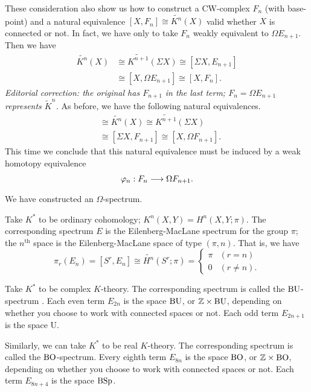\documentclass[../main]{subfiles}
\begin{document}
These consideration also show us how to construct a CW-complex $F_n$ (with base-point) and a natural equivalence $[X,F_n] \cong \widetilde{K^n}(X)$ valid whether $X$ is connected or not. In fact, we have only to take $F_n$ weakly equivalent to $\Omega E_{n+1}$. Then we have
    \begin{align*}
    \widetilde{K^n}(X)
    &\cong
    \widetilde{K^{n+1}}(\Sigma   X)
        \cong [\Sigma   X, E_{n+1}]
        \\
    &\cong
    [X, \Omega E_{n+1}]
        \cong [X, F_n].
    \end{align*}
\noindent\emph{Editorial correction: the original has $F_{n+1}$ in the last term; $F_n=\Omega E_{n+1}$ represents $\widetilde K^n$.}
As before, we have the following natural equivalences.
    \begin{align*}
    [X,F_n]
    &\cong
    \widetilde{K^n}(X)
        \cong \widetilde{K^{n+1}}(\Sigma   X)
        \\
    &\cong
    [\Sigma   X, F_{n+1}]
        \cong [X, \Omega F_{n+1}]. %
    \end{align*}
This time we conclude that this natural equivalence must be induced by a weak homotopy equivalence
\[
\varphi_n: F_n \lar{} \Omega F_{n+1}.
\]
We have constructed an $\Omega$-spectrum.

\begin{example} \label{ex:p3ch02.1}
Take $K^\ast$ to be ordinary cohomology; $K^n(X,Y)=H^n(X,Y;\pi)$. The corresponding spectrum $E$ is the Eilenberg-MacLane spectrum for the group $\pi$; the $n^{\text{th}}$ space is the Eilenberg-MacLane space  of type $(\pi,n)$. That is, we have
\[
\pi_r(E_n)
=
[S^r,E_n]
\cong
\widetilde{H^n}(S^r;\pi)
=
\begin{cases}
\pi &(r=n) \\
  0 &(r\neq n).
\end{cases}
\]
\end{example}

\begin{example} \label{ex:p3ch02.2}
Take $K^\ast$ to be complex $K$-theory. The corresponding spectrum is called the $\mathrm{BU}$-spectrum . Each even term $E_{2n}$ is the space $\mathrm{BU}$, or $\mathbb Z \times \mathrm{BU}$, depending on whether you choose to work with connected spaces or not. Each odd term $E_{2n+1}$ is the space U.

Similarly, we can take $K^\ast$ to be real $K$-theory. The corresponding spectrum is called the $\mathrm{BO}$-spectrum. Every eighth term $E_{8n}$ is the space $\mathrm{BO}$, or $\mathbb Z \times \mathrm{BO}$, depending on whether you choose to work with connected spaces or not. Each term $E_{8n+4}$ is the space $\mathrm{BSp}$.
\end{example}
\end{document}
